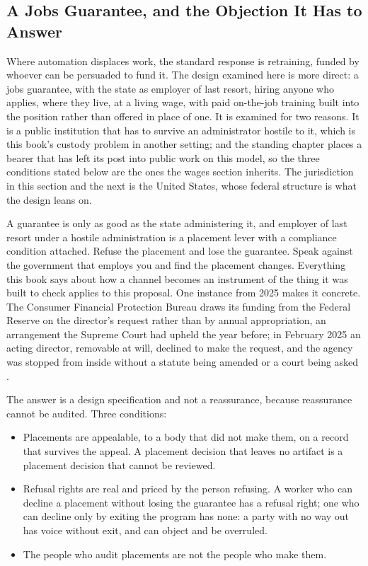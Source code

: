 \subsection{A Jobs Guarantee, and the Objection It Has to Answer}
\label{sec:guarantee-objection}
Where automation displaces work, the standard response is retraining, funded by whoever can be persuaded to fund it. The design examined here is more direct: a jobs guarantee, with the state as employer of last resort, hiring anyone who applies, where they live, at a living wage, with paid on-the-job training built into the position rather than offered in place of one. It is examined for two reasons. It is a public institution that has to survive an administrator hostile to it, which is this book's custody problem in another setting; and the standing chapter places a bearer that has left its post into public work on this model, so the three conditions stated below are the ones the wages section inherits. The jurisdiction in this section and the next is the United States, whose federal structure is what the design leans on.

A guarantee is only as good as the state administering it, and employer of last resort under a hostile administration is a placement lever with a compliance condition attached. Refuse the placement and lose the guarantee. Speak against the government that employs you and find the placement changes. Everything this book says about how a channel becomes an instrument of the thing it was built to check applies to this proposal. One instance from 2025 makes it concrete. The Consumer Financial Protection Bureau draws its funding from the Federal Reserve on the director's request rather than by annual appropriation, an arrangement the Supreme Court had upheld the year before; in February 2025 an acting director, removable at will, declined to make the request, and the agency was stopped from inside without a statute being amended or a court being asked \autocite{cfpb2024cfsa,kolodziej2025cfpb}.

The answer is a design specification and not a reassurance, because reassurance cannot be audited. Three conditions:

\begin{itemize}
  \item Placements are appealable, to a body that did not make them, on a record that survives the appeal. A placement decision that leaves no artifact is a placement decision that cannot be reviewed.
  \item Refusal rights are real and priced by the person refusing. A worker who can decline a placement without losing the guarantee has a refusal right; one who can decline only by exiting the program has none: a party with no way out has voice without exit, and can object and be overruled.
  \item The people who audit placements are not the people who make them.
\end{itemize}

